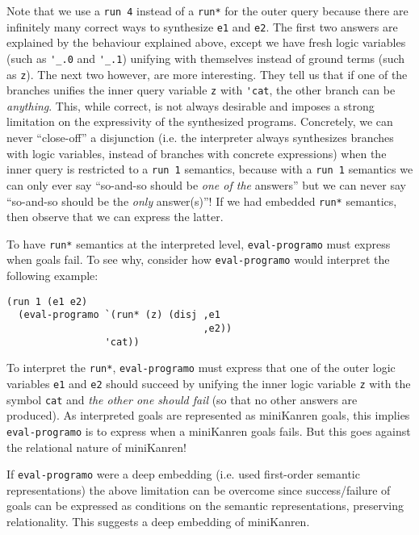Note that we use a \Verb|run 4| instead of a \Verb|run*| for the outer query
because there are infinitely many correct ways to synthesize \Verb|e1| and
\Verb|e2|. The first two answers are explained by the behaviour explained above,
except we have fresh logic variables (such as \Verb|'_.0| and \Verb|'_.1|)
unifying with themselves instead of ground terms (such as \Verb|z|). The next
two however, are more interesting. They tell us that if one of the branches
unifies the inner query variable \Verb|z| with \Verb|'cat|, the other branch can
be \textit{anything}. This, while correct, is not always desirable and imposes a
strong limitation on the expressivity of the synthesized programs.  Concretely,
we can never ``close-off'' a disjunction (i.e. the interpreter always
synthesizes branches with logic variables, instead of branches with concrete
expressions) when the inner query is restricted to a \Verb|run 1| semantics,
because with a \Verb|run 1| semantics we can only ever say ``so-and-so should be
\textit{one of the} answers'' but we can never say ``so-and-so should be the
\textit{only} answer(s)''!  If we had embedded \Verb|run*| semantics, then
observe that we can express the latter.

To have \Verb|run*| semantics at the interpreted level, \Verb|eval-programo|
must express when goals fail. To see why, consider how \Verb|eval-programo|
would interpret the following example:
\begin{Verbatim}
(run 1 (e1 e2)
  (eval-programo `(run* (z) (disj ,e1
                                  ,e2))
                 'cat))
\end{Verbatim}

To interpret the \Verb|run*|, \Verb|eval-programo| must express that one of the
outer logic variables \Verb|e1| and \Verb|e2| should succeed by unifying the
inner logic variable \Verb|z| with the symbol \Verb|cat| and \textit{the other
one should fail} (so that no other answers are produced). As interpreted goals
are represented as miniKanren goals, this implies \Verb|eval-programo| is to
express when a miniKanren goals fails. But this goes against the relational
nature of miniKanren!

If \Verb|eval-programo| were a deep embedding (i.e. used first-order semantic
representations) the above limitation can be overcome since success/failure of
goals can be expressed as conditions on the semantic representations, preserving
relationality. This suggests a deep embedding of miniKanren.



